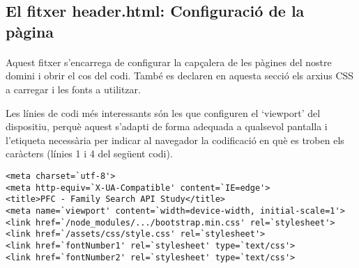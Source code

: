 \subsection{El fitxer header.html: Configuració de la pàgina}

    \paragraph{}
    Aquest fitxer s'encarrega de configurar la capçalera de les pàgines del nostre domini i obrir el cos del codi. També es declaren en aquesta secció els arxius CSS a carregar i les fonts a utilitzar.

    Les línies de codi més interessants són les que configuren el `viewport' del dispositiu, perquè aquest s'adapti de forma adequada a qualsevol pantalla i l'etiqueta necessària per indicar al navegador la codificació en què es troben els caràcters (línies 1 i 4 del següent codi).

    \begin{lstlisting}[style=rawOwn,caption={Capçaleres incloses en el fitxer header.html}]
<meta charset=`utf-8'>
<meta http-equiv=`X-UA-Compatible' content=`IE=edge'>
<title>PFC - Family Search API Study</title>
<meta name=`viewport' content=`width=device-width, initial-scale=1'>
<link href=`/node_modules/.../bootstrap.min.css' rel=`stylesheet'>
<link href=`/assets/css/style.css' rel=`stylesheet'>
<link href=`fontNumber1' rel=`stylesheet' type=`text/css'>
<link href=`fontNumber2' rel=`stylesheet' type=`text/css'>
    \end{lstlisting}
